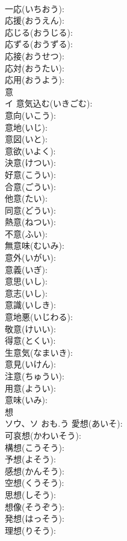 \documentclass[8pt]{extreport}
\begin{document}
\begin{CJK}{UTF8}{min}
\\	一応(いちおう): 
\\	応援(おうえん): 
\\	応じる(おうじる): 
\\	応ずる(おうずる): 
\\	応接(おうせつ): 
\\	応対(おうたい): 
\\	応用(おうよう): 
\\	意			
\\	イ		意気込む(いきごむ): 
\\	意向(いこう): 
\\	意地(いじ): 
\\	意図(いと): 
\\	意欲(いよく): 
\\	決意(けつい): 
\\	好意(こうい): 
\\	合意(ごうい): 
\\	他意(たい): 
\\	同意(どうい): 
\\	熱意(ねつい): 
\\	不意(ふい): 
\\	無意味(むいみ): 
\\	意外(いがい): 
\\	意義(いぎ): 
\\	意思(いし): 
\\	意志(いし): 
\\	意識(いしき): 
\\	意地悪(いじわる): 
\\	敬意(けいい): 
\\	得意(とくい): 
\\	生意気(なまいき): 
\\	意見(いけん): 
\\	注意(ちゅうい): 
\\	用意(ようい): 
\\	意味(いみ): 
\\	想			
\\	ソウ、ソ	おも.う	愛想(あいそ): 
\\	可哀想(かわいそう): 
\\	構想(こうそう): 
\\	予想(よそう): 
\\	感想(かんそう): 
\\	空想(くうそう): 
\\	思想(しそう): 
\\	想像(そうぞう): 
\\	発想(はっそう): 
\\	理想(りそう): 

\end{CJK}
\end{document}
